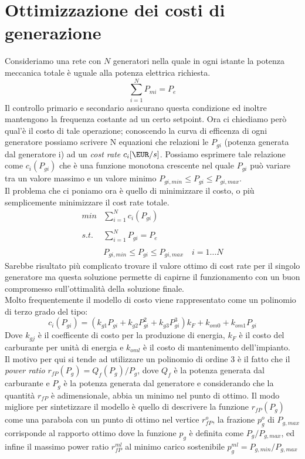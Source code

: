 \label{capitolo5}
\section{Ottimizzazione dei costi di generazione}
Consideriamo una rete con $N$ generatori nella quale in ogni istante la potenza meccanica totale è uguale alla potenza elettrica richiesta.
$$\sum_{i=1}^{N}P_{mi}= P_e$$
Il controllo primario e secondario assicurano questa condizione ed inoltre mantengono la frequenza costante ad un certo setpoint. Ora ci chiediamo però qual'è il costo di tale operazione; conoscendo la curva di efficenza di ogni generatore possiamo scrivere N equazioni che relazioni le $P_{gi}$ (potenza generata dal generatore i) ad un \emph{cost rate} $c_i[\EUR/s]$. Possiamo esprimere tale relazione come $c_i(P_{gi})$ che è una funzione monotona crescente nel quale $P_{gi}$ può variare tra un valore massimo e un valore minimo $P_{gi,min}\leq P_{gi}\leq P_{gi,max}$.\\
Il problema che ci poniamo ora è quello di minimizzare il costo, o più semplicemente minimizzare il cost rate totale.
$$
\begin{array}{cc}
min &\sum_{i=1}^N c_i(P_{gi})\\
\\
s.t. &\sum_{i=1}^NP_{gi}=P_e\\
\\
&P_{gi,min}\leq P_{gi}\leq P_{gi,max} \quad i=1\dots N
\end{array}
$$
Sarebbe risultato più complicato trovare il valore ottimo di cost rate per il singolo generatore ma questa soluzione permette di capirne il funzionamento con un buon compromesso sull'ottimalità della soluzione finale.\\
Molto frequentemente il modello di costo viene rappresentato come un polinomio di terzo grado del tipo:
$$c_i(P_{gi})=(k_{g1}P_{gi}+k_{g2}P_{gi}^2+k_{g3}P_{gi}^3)k_F+k_{om0}+k_{om1}P_{gi}$$
Dove $k_{gj}$ è il coefficente di costo per la produzione di energia, $k_F$ è il costo del carburante per unità di energia e $k_{om\textit{l}}$ è il costo di mantenimento dell'impianto.\\
Il motivo per qui si tende ad utilizzare un polinomio di ordine 3 è il fatto che il \emph{power ratio} $r_{fP}(P_g)=Q_f(P_g)/P_g$, dove $Q_f$ è la potenza generata dal carburante e $P_g$ è la potenza generata dal generatore e considerando che la quantità $r_{fP}$ è adimensionale, abbia un minimo nel punto di ottimo. Il modo migliore per sintetizzare il modello è quello di descrivere la funzione $r_{fP}(P_g)$ come una parabola con un punto di ottimo nel vertice $r_{fP}^o$, la frazione $p_g^o$ di $ P_{g,max}$ corrisponde al rapporto ottimo dove la funzione $p_g$ è definita come $P_g/P_{g,max}$, ed infine il massimo power ratio $r_{fP}^{ml}$ al minimo carico sostenibile 	$p_g^{ml}= P_{g,min} /P_{g,max}$
